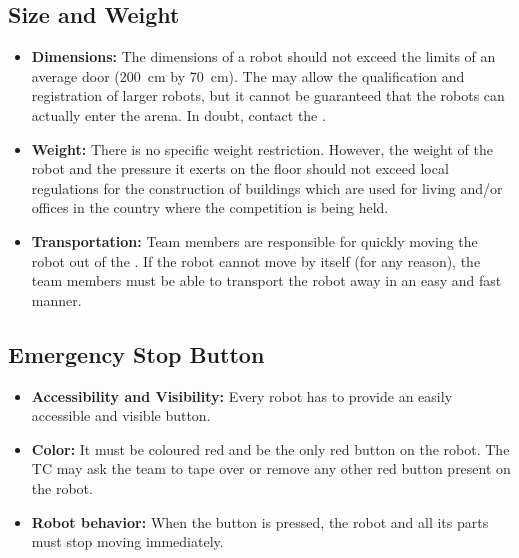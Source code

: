
\subsection{Size and Weight}
\label{sec:rules:robotappearance_opl:size}

\begin{itemize}
	\item \textbf{Dimensions:} The dimensions of a robot should not exceed the limits of an average door (\SI{200}{\centi\meter} by \SI{70}{\centi\meter}). The \TC{} may allow the qualification and registration of larger robots, but it cannot be guaranteed that the robots can actually enter the arena. In doubt, contact the \LOC{}.
	\item \textbf{Weight:} There is no specific weight restriction. However, the weight of the robot and the pressure it exerts on the floor should not exceed local regulations for the construction of buildings which are used for living and/or offices in the country where the competition is being held.
	\item \textbf{Transportation:} Team members are responsible for quickly moving the robot out of the \Arena{}.	If the robot cannot move by itself (for any reason), the team members must be able to transport the robot away in an easy and fast manner.
\end{itemize}


\subsection{Emergency Stop Button}
\label{sec:rules:robotappearance_opl:esb}

\begin{itemize}
	\item \textbf{Accessibility and Visibility:} Every robot has to provide an easily accessible and visible \EmergencyStop{} button.
	\item \textbf{Color:} It must be coloured red and be the only red button on the robot.
	The TC may ask the team to tape over or remove any other red button present on the robot.
	\item \textbf{Robot behavior:} When the \EmergencyStop{} button is pressed, the robot and all its parts must stop moving immediately.
\end{itemize}


